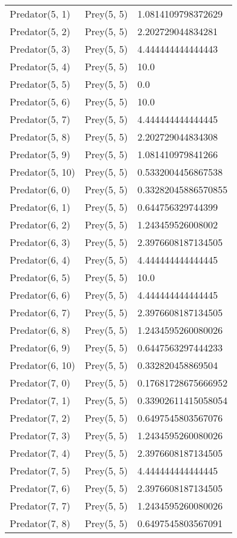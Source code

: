 \begin{longtable}{| p{} | p{} | p{} |}
Predator(5, 1) & Prey(5, 5) &1.0814109798372629\\
Predator(5, 2) & Prey(5, 5) &2.202729044834281\\
Predator(5, 3) & Prey(5, 5) &4.444444444444443\\
Predator(5, 4) & Prey(5, 5) &10.0\\
Predator(5, 5) & Prey(5, 5) &0.0\\
Predator(5, 6) & Prey(5, 5) &10.0\\
Predator(5, 7) & Prey(5, 5) &4.444444444444445\\
Predator(5, 8) & Prey(5, 5) &2.202729044834308\\
Predator(5, 9) & Prey(5, 5) &1.081410979841266\\
Predator(5, 10) & Prey(5, 5) &0.5332004456867538\\
Predator(6, 0) & Prey(5, 5) &0.33282045886570855\\
Predator(6, 1) & Prey(5, 5) &0.644756329744399\\
Predator(6, 2) & Prey(5, 5) &1.243459526008002\\
Predator(6, 3) & Prey(5, 5) &2.3976608187134505\\
Predator(6, 4) & Prey(5, 5) &4.444444444444445\\
Predator(6, 5) & Prey(5, 5) &10.0\\
Predator(6, 6) & Prey(5, 5) &4.444444444444445\\
Predator(6, 7) & Prey(5, 5) &2.3976608187134505\\
Predator(6, 8) & Prey(5, 5) &1.2434595260080026\\
Predator(6, 9) & Prey(5, 5) &0.6447563297444233\\
Predator(6, 10) & Prey(5, 5) &0.332820458869504\\
Predator(7, 0) & Prey(5, 5) &0.17681728675666952\\
Predator(7, 1) & Prey(5, 5) &0.33902611415058054\\
Predator(7, 2) & Prey(5, 5) &0.6497545803567076\\
Predator(7, 3) & Prey(5, 5) &1.2434595260080026\\
Predator(7, 4) & Prey(5, 5) &2.3976608187134505\\
Predator(7, 5) & Prey(5, 5) &4.444444444444445\\
Predator(7, 6) & Prey(5, 5) &2.3976608187134505\\
Predator(7, 7) & Prey(5, 5) &1.2434595260080026\\
Predator(7, 8) & Prey(5, 5) &0.6497545803567091\\

\end{longtable}
